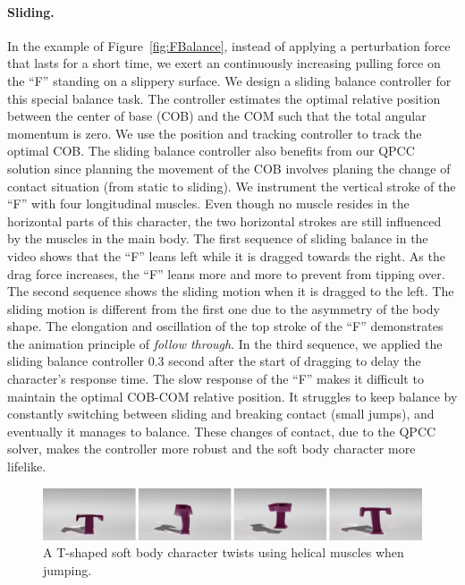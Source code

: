 \paragraph{Sliding.} In the example of Figure~\ref{fig:FBalance},
instead of applying a perturbation force that lasts for a short time,
we exert an continuously increasing pulling force on the ``F'' standing on
a slippery surface. We design a sliding balance controller for this
special balance task. The controller estimates the optimal relative
position between the center of base (COB) and the COM such that the
total angular momentum is zero. We use the position and tracking controller to track the optimal COB. The sliding balance controller also benefits from our QPCC
solution since planning the movement of the COB involves planing the
change of contact situation (from static to sliding).  We instrument the vertical stroke of the ``F'' with four
longitudinal muscles. Even though no muscle resides in the horizontal
parts of this character, the two horizontal strokes are still
influenced by the muscles in the main body. The first sequence of
sliding balance in the video shows that the ``F'' leans left while it is
dragged towards the right.  As the drag force increases, the ``F'' leans more
and more to prevent from tipping over. The second sequence shows the
sliding motion when it is dragged to the left. The sliding motion is
different from the first one due to the asymmetry of the body
shape. The elongation and oscillation of the top stroke of the ``F''
demonstrates the animation principle of \emph{follow through}. In the
third sequence, we applied the sliding balance controller 0.3 second
after the start of dragging to delay the character's
response time. The slow response of the ``F'' makes it difficult to
maintain the optimal COB-COM relative position. It struggles to keep
balance by constantly switching between sliding and breaking contact
(small jumps), and eventually it manages to balance.  These changes of
contact, due to the QPCC solver, makes the controller more robust and
the soft body character more lifelike.

\begin{figure}[t]
\centering
\includegraphics[width=\textwidth]{figures/TTwist.eps}
\caption{A T-shaped soft body character twists using helical muscles when jumping.}
\label{fig:TJump}
\end{figure}


